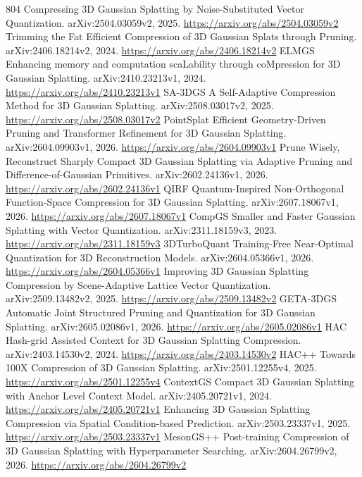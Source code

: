 \documentclass[11pt]{article}
\begin{document}
\begin{thebibliography}{804}
 Compressing 3D Gaussian Splatting by Noise-Substituted Vector Quantization. arXiv:2504.03059v2, 2025. \url{https://arxiv.org/abs/2504.03059v2}
 Trimming the Fat Efficient Compression of 3D Gaussian Splats through Pruning. arXiv:2406.18214v2, 2024. \url{https://arxiv.org/abs/2406.18214v2}
 ELMGS Enhancing memory and computation scaLability through coMpression for 3D Gaussian Splatting. arXiv:2410.23213v1, 2024. \url{https://arxiv.org/abs/2410.23213v1}
 SA-3DGS A Self-Adaptive Compression Method for 3D Gaussian Splatting. arXiv:2508.03017v2, 2025. \url{https://arxiv.org/abs/2508.03017v2}
 PointSplat Efficient Geometry-Driven Pruning and Transformer Refinement for 3D Gaussian Splatting. arXiv:2604.09903v1, 2026. \url{https://arxiv.org/abs/2604.09903v1}
 Prune Wisely, Reconstruct Sharply Compact 3D Gaussian Splatting via Adaptive Pruning and Difference-of-Gaussian Primitives. arXiv:2602.24136v1, 2026. \url{https://arxiv.org/abs/2602.24136v1}
 QIRF Quantum-Inspired Non-Orthogonal Function-Space Compression for 3D Gaussian Splatting. arXiv:2607.18067v1, 2026. \url{https://arxiv.org/abs/2607.18067v1}
 CompGS Smaller and Faster Gaussian Splatting with Vector Quantization. arXiv:2311.18159v3, 2023. \url{https://arxiv.org/abs/2311.18159v3}
 3DTurboQuant Training-Free Near-Optimal Quantization for 3D Reconstruction Models. arXiv:2604.05366v1, 2026. \url{https://arxiv.org/abs/2604.05366v1}
 Improving 3D Gaussian Splatting Compression by Scene-Adaptive Lattice Vector Quantization. arXiv:2509.13482v2, 2025. \url{https://arxiv.org/abs/2509.13482v2}
 GETA-3DGS Automatic Joint Structured Pruning and Quantization for 3D Gaussian Splatting. arXiv:2605.02086v1, 2026. \url{https://arxiv.org/abs/2605.02086v1}
 HAC Hash-grid Assisted Context for 3D Gaussian Splatting Compression. arXiv:2403.14530v2, 2024. \url{https://arxiv.org/abs/2403.14530v2}
 HAC++ Towards 100X Compression of 3D Gaussian Splatting. arXiv:2501.12255v4, 2025. \url{https://arxiv.org/abs/2501.12255v4}
 ContextGS Compact 3D Gaussian Splatting with Anchor Level Context Model. arXiv:2405.20721v1, 2024. \url{https://arxiv.org/abs/2405.20721v1}
 Enhancing 3D Gaussian Splatting Compression via Spatial Condition-based Prediction. arXiv:2503.23337v1, 2025. \url{https://arxiv.org/abs/2503.23337v1}
 MesonGS++ Post-training Compression of 3D Gaussian Splatting with Hyperparameter Searching. arXiv:2604.26799v2, 2026. \url{https://arxiv.org/abs/2604.26799v2}

\end{thebibliography}
\end{document}
